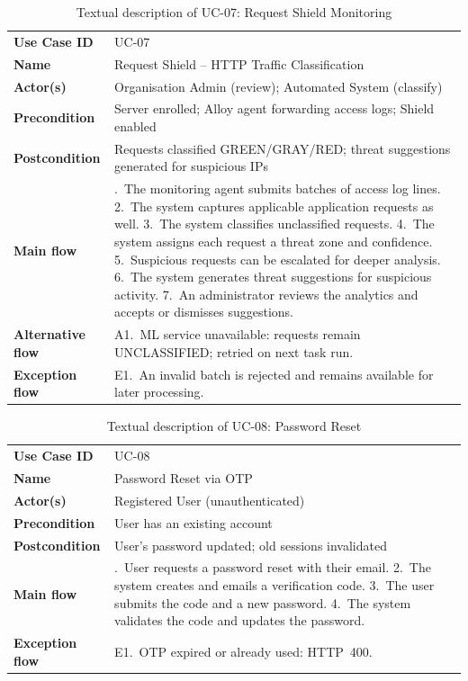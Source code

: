 \begin{longtable}{@{}>{\raggedright\arraybackslash}p{} >{\raggedright\arraybackslash}p{}@{}}
\caption{Textual description of UC-07: Request Shield Monitoring}\label{tab:uc07}\\
\toprule
\textbf{Use Case ID} & UC-07\\
\textbf{Name} & Request Shield -- HTTP Traffic Classification\\
\textbf{Actor(s)} & Organisation Admin (review); Automated System (classify)\\
\textbf{Precondition} & Server enrolled; Alloy agent forwarding access logs; Shield enabled\\
\textbf{Postcondition} & Requests classified GREEN/GRAY/RED; threat suggestions generated for suspicious IPs\\
\textbf{Main flow} &
  1.~The monitoring agent submits batches of access log lines.
  2.~The system captures applicable application requests as well.
  3.~The system classifies unclassified requests.
  4.~The system assigns each request a threat zone and confidence.
  5.~Suspicious requests can be escalated for deeper analysis.
  6.~The system generates threat suggestions for suspicious activity.
  7.~An administrator reviews the analytics and accepts or dismisses suggestions.\\
\textbf{Alternative flow} &
  A1.~ML service unavailable: requests remain UNCLASSIFIED; retried on next task run.\\
\textbf{Exception flow} &
  E1.~An invalid batch is rejected and remains available for later processing.\\
\bottomrule
\end{longtable}

\begin{longtable}{@{}>{\raggedright\arraybackslash}p{} >{\raggedright\arraybackslash}p{}@{}}
\caption{Textual description of UC-08: Password Reset}\label{tab:uc08}\\
\toprule
\textbf{Use Case ID} & UC-08\\
\textbf{Name} & Password Reset via OTP\\
\textbf{Actor(s)} & Registered User (unauthenticated)\\
\textbf{Precondition} & User has an existing account\\
\textbf{Postcondition} & User's password updated; old sessions invalidated\\
\textbf{Main flow} &
  1.~User requests a password reset with their email.
  2.~The system creates and emails a verification code.
  3.~The user submits the code and a new password.
  4.~The system validates the code and updates the password.\\
\textbf{Exception flow} &
  E1.~OTP expired or already used: HTTP~400.\\
\bottomrule
\end{longtable}

